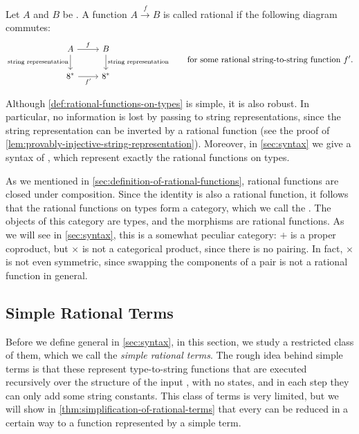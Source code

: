 \begin{definition}\label{def:rational-functions-on-types}
    Let $A$ and $B$ be . A function $A \xrightarrow f  B$ is called rational if  the following diagram commutes:
    \[
    \begin{tikzcd}
    A 
    \ar[r,"f"]
    \ar[d,"\text{string representation}"']
    &
    \ar[d,"\text{string representation}"]
    B
    \\
    8^* 
    \ar[r,"f'"']
    &
    8^*
    \end{tikzcd}
    \qquad \text{for some rational string-to-string function $f'$.}
    \]
\end{definition}
Although \cref{def:rational-functions-on-types} is simple, it is also robust. In particular, no information is lost by passing to string representations, since the string representation can be inverted by a rational function (see the proof of \cref{lem:provably-injective-string-representation}). Moreover, in \cref{sec:syntax} we give a syntax of , which represent exactly the rational functions on types.

As we mentioned in \cref{sec:definition-of-rational-functions}, rational functions are closed under composition. Since the identity is also a rational function, it follows that the rational functions on types  form a category, which we call the . The objects of this category are types, and the morphisms are rational functions. As we will see in \cref{sec:syntax}, this is a somewhat peculiar category: $+$ is a proper coproduct, but $\times$ is not a categorical product, since there is no pairing. In fact, $\times$ is not even symmetric, since swapping the components of a pair is not a rational function in general.

\subsection{Simple Rational Terms} Before we define general  in \cref{sec:syntax}, in this section, we study a restricted class of them, which we call the \emph{simple rational terms}. The rough idea behind simple terms is that these represent type-to-string functions that are executed recursively over the structure of the input , with no states, and in each step they can only add some string constants. This class of terms is very limited, but we will show in \cref{thm:simplification-of-rational-terms} that every  can be reduced in a certain way to a function represented by a simple term. 

